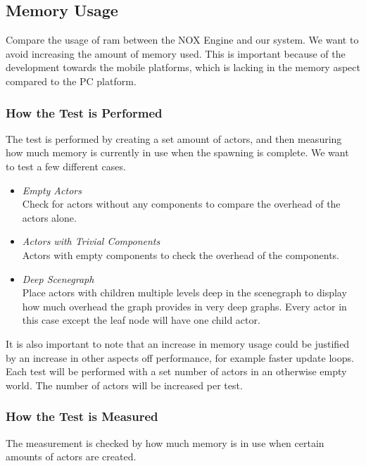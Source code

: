 \subsection{Memory Usage}
Compare the usage of ram between the NOX Engine and our system.
We want to avoid increasing the amount of memory used.
This is important because of the development towards the mobile platforms, which is lacking in the memory aspect compared to the PC platform.

\subsubsection*{How the Test is Performed}
The test is performed by creating a set amount of actors, and then measuring how much memory is currently in use when the spawning is complete.
We want to test a few different cases.

\begin{itemize}

    \item\noindent\textit{Empty Actors}\\
    Check for actors without any components to compare the overhead of the actors alone.

    \item\noindent\textit{Actors with Trivial Components}\\
    Actors with empty components to check the overhead of the components.

    \item\noindent\textit{Deep Scenegraph}\\
    Place actors with children multiple levels deep in the scenegraph to display how much overhead the graph provides in very deep graphs.
    Every actor in this case except the leaf node will have one child actor.

\end{itemize}

\noindent It is also important to note that an increase in memory usage could be justified by an increase in other aspects off performance, for example faster update loops.
Each test will be performed with a set number of actors in an otherwise empty world.
The number of actors will be increased per test.

\subsubsection*{How the Test is Measured}
The measurement is checked by how much memory is in use when certain amounts of actors are created.
